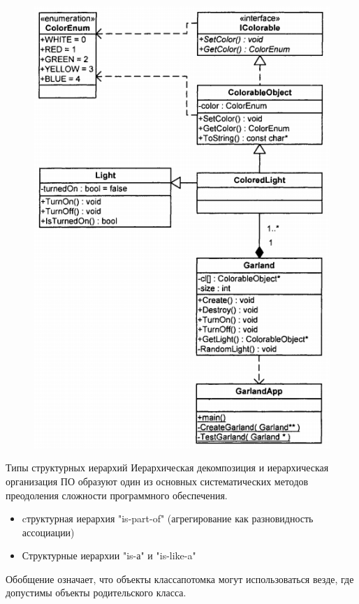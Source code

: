 \documentclass{beamer}
\begin{document}
\begin{frame}
\begin{figure}[h]
\centering
\includegraphics[scale=0.45]{images/lec04-pic21.png}
\end{figure}
\end{frame}

\begin{frame}{Типы структурных иерархий}
Иерархическая декомпозиция и иерархическая организация ПО образуют один из основных систематических методов преодоления сложности программного обеспечения.
\begin{itemize}
\item cтруктурная иерархия "is-part-of" (агрегирование как разновидность ассоциации)
\item Структурные иерархии "is-а" и "is-like-a"
\end{itemize}
\begin{block}{Обобщение}
означает, что объекты классапотомка могут использоваться везде, где допустимы объекты родительского класса. 
\end{block}
\end{frame}
\end{document}
